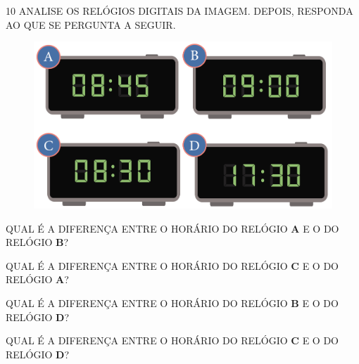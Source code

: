 \pagebreak
\num{10} ANALISE OS RELÓGIOS DIGITAIS DA IMAGEM. DEPOIS, RESPONDA AO QUE SE PERGUNTA A SEGUIR.


\begin{figure}[htpb!]
\centering
\includegraphics[width=.5\textwidth]{./media/SAEB_1ANO_MAT_FIGURA56.png}
\end{figure}

\begin{escolha}
\item QUAL É A DIFERENÇA ENTRE O HORÁRIO DO RELÓGIO \textbf{A} E O DO RELÓGIO \textbf{B}?

\item QUAL É A DIFERENÇA ENTRE O HORÁRIO DO RELÓGIO \textbf{C} E O DO RELÓGIO \textbf{A}?

\item QUAL É A DIFERENÇA ENTRE O HORÁRIO DO RELÓGIO \textbf{B} E O DO RELÓGIO \textbf{D}?

\item QUAL É A DIFERENÇA ENTRE O HORÁRIO DO RELÓGIO \textbf{C} E O DO RELÓGIO \textbf{D}?
\end{escolha}




